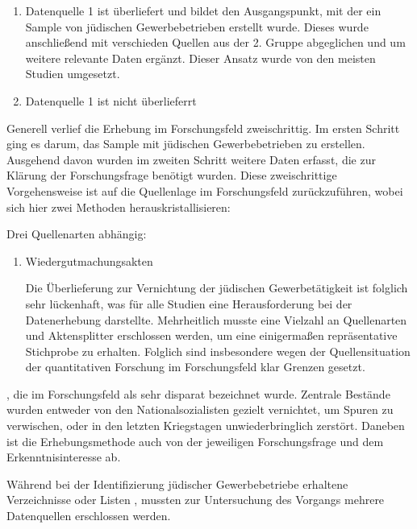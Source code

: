 \begin{enumerate}
    \item Datenquelle 1 ist überliefert und bildet den Ausgangspunkt, mit der ein Sample von jüdischen Gewerbebetrieben erstellt wurde. Dieses wurde anschließend mit verschieden Quellen aus der 2. Gruppe abgeglichen und um weitere relevante Daten ergänzt. Dieser Ansatz wurde von den meisten Studien umgesetzt.  
    \item Datenquelle 1 ist nicht überlieferrt 
\end{enumerate}
 


Generell verlief die Erhebung im Forschungsfeld zweischrittig. Im ersten Schritt ging es darum, das Sample mit jüdischen Gewerbebetrieben zu erstellen. Ausgehend davon wurden im zweiten Schritt weitere Daten erfasst, die zur Klärung der Forschungsfrage benötigt wurden. Diese zweischrittige Vorgehensweise ist auf die Quellenlage im Forschungsfeld zurückzuführen, wobei sich hier zwei Methoden herauskristallisieren:

Drei Quellenarten abhängig: 

\begin{enumerate}
    \item 
    
    Wiedergutmachungsakten
    
    Die Überlieferung zur Vernichtung der jüdischen Gewerbetätigkeit ist folglich sehr lückenhaft, was für alle Studien eine Herausforderung bei der Datenerhebung darstellte. Mehrheitlich musste eine Vielzahl an Quellenarten und Aktensplitter erschlossen werden, um eine einigermaßen repräsentative Stichprobe zu erhalten. Folglich sind insbesondere wegen der Quellensituation der quantitativen Forschung im Forschungsfeld klar Grenzen gesetzt. 
\end{enumerate}





, die im Forschungsfeld als sehr disparat bezeichnet wurde. Zentrale Bestände wurden entweder von den Nationalsozialisten gezielt vernichtet, um Spuren zu verwischen, oder in den letzten Kriegstagen unwiederbringlich zerstört. Daneben ist die Erhebungsmethode auch von der jeweiligen Forschungsfrage und dem Erkenntnisinteresse ab. 


Während bei der Identifizierung jüdischer Gewerbebetriebe erhaltene Verzeichnisse oder Listen , mussten zur Untersuchung des Vorgangs mehrere Datenquellen erschlossen werden.





